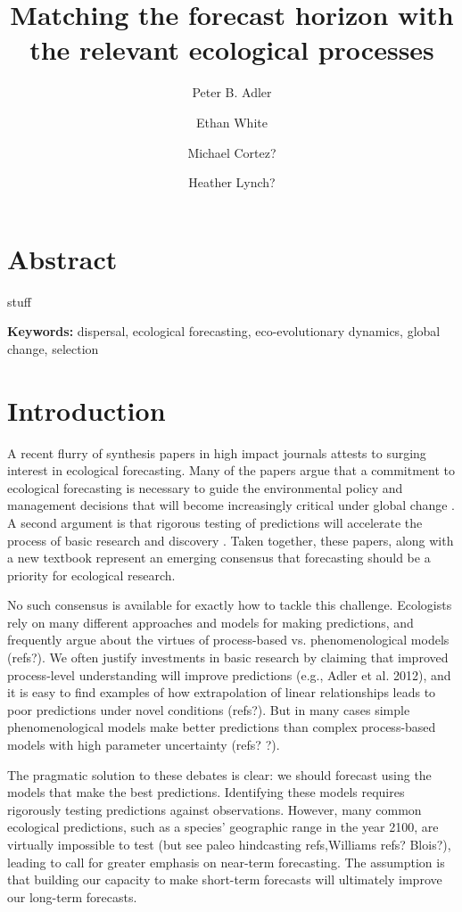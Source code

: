 \documentclass[11pt]{article}
\title{\textbf{ Matching the forecast horizon with the relevant ecological processes }}
\author[1]{Peter B. Adler}  %
\author[2]{Ethan White}
\author[1]{Michael Cortez?}
\author[3]{Heather Lynch?}
\affil[1]{Department of Wildland Resources and the Ecology Center, Utah State University, Logan, Utah}
\affil[2]{some shitty Florida joint}
\begin{document}
\maketitle

\linenumbers

\section*{Abstract}

stuff

\textbf{\large{Keywords:}} dispersal, ecological forecasting, eco-evolutionary dynamics, global change, selection

\section*{Introduction}

A recent flurry of synthesis papers in high impact journals attests to surging interest in ecological forecasting. Many of the papers 
argue that a commitment to ecological forecasting is necessary to guide the environmental policy and management
decisions that will become increasingly critical under global change \citep{clark_ecological_2001,mouquet_review:_2015,dietze_iterative_2018}.
A second argument is that rigorous testing of predictions will accelerate the process of basic research and discovery 
\citep{houlahan_priority_2017,dietze_prediction_2017,dietze_iterative_2018}.
Taken together, these papers, along with a new textbook \citep{dietze_ecological_2017} represent an emerging consensus that 
forecasting should be a priority for ecological research.

No such consensus is available for exactly how to tackle this challenge.
Ecologists rely on many different approaches and models for making predictions, and 
frequently argue about the virtues of process-based vs. phenomenological models (refs?).
We often justify investments in basic research by claiming that improved process-level understanding will improve predictions (e.g., Adler et al. 2012),
and it is easy to find examples of how extrapolation of linear relationships leads to poor predictions under novel conditions (refs?).
But in many cases simple phenomenological models make better predictions than complex process-based models with high parameter
uncertainty (refs? \citealt{tredennick_we_2017}?).

The pragmatic solution to these debates is clear: we should forecast using the models that make the best predictions.
Identifying these models requires rigorously testing predictions against observations. However, many common ecological predictions,
such as a species' geographic range in the year 2100, are virtually impossible to test (but see paleo hindcasting refs,Williams refs? Blois?), 
leading \citep{dietze_iterative_2018} to call for greater emphasis on near-term forecasting. The assumption is that building 
our capacity to make short-term forecasts will ultimately improve our long-term forecasts.
\end{document}
